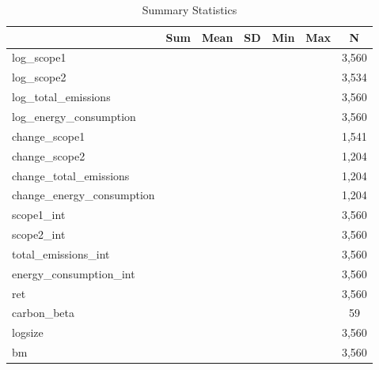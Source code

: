\begin{table}[htbp]\centering
\def\sym#1{\ifmmode^{#1}\else\(^{#1}\)\fi}
\caption{Summary Statistics \label{table1stata}}
\begin{tabular}{l*{1}{cccccc}}
\toprule
                    &         Sum&        Mean&          SD&         Min&         Max&           N\\
\midrule
log\_scope1          &            &            &            &            &            &       3,560\\
log\_scope2          &            &            &            &            &            &       3,534\\
log\_total\_emissions &            &            &            &            &            &       3,560\\
log\_energy\_consumption&            &            &            &            &            &       3,560\\
change\_scope1       &            &            &            &            &            &       1,541\\
change\_scope2       &            &            &            &            &            &       1,204\\
change\_total\_emissions&            &            &            &            &            &       1,204\\
change\_energy\_consumption&            &            &            &            &            &       1,204\\
scope1\_int          &            &            &            &            &            &       3,560\\
scope2\_int          &            &            &            &            &            &       3,560\\
total\_emissions\_int &            &            &            &            &            &       3,560\\
energy\_consumption\_int&            &            &            &            &            &       3,560\\
ret                 &            &            &            &            &            &       3,560\\
carbon\_beta         &            &            &            &            &            &          59\\
logsize             &            &            &            &            &            &       3,560\\
bm                  &            &            &            &            &            &       3,560\\

\end{tabular}
\end{table}
